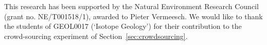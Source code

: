 \documentclass[gchron, manuscript]{copernicus}
\begin{document}

\begin{acknowledgements}
This research has been supported by the Natural Environment Research
Council (grant no. NE/T001518/1), awarded to Pieter Vermeesch. We would like
to thank the students of GEOL0017 (`Isotope Geology') for their contribution
to the crowd-sourcing experiment of Section~\ref{sec:crowdsourcing}.
\end{acknowledgements}



\end{document}
